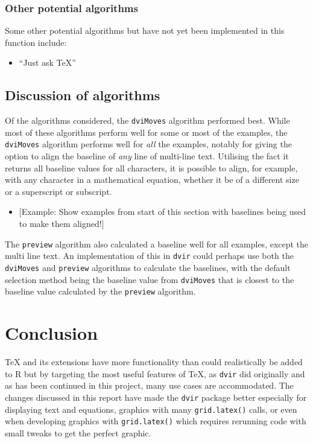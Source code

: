 \documentclass[]{article}
\providecommand{\tightlist}{%
  \setlength{\itemsep}{0pt}\setlength{\parskip}{0pt}}
\begin{document}
\subsubsection{Other potential
algorithms}\label{other-potential-algorithms}

Some other potential algorithms but have not yet been implemented in
this function include:

\begin{itemize}
\tightlist
\item
  ``Just ask \TeX{}''
\end{itemize}

\subsection{Discussion of algorithms}\label{discussion-of-algorithms}

Of the algorithms considered, the \texttt{dviMoves} algorithm performed
best. While most of these algorithms perform well for some or most of
the examples, the \texttt{dviMoves} algorithm performs well for
\emph{all} the examples, notably for giving the option to align the
baseline of \emph{any} line of multi-line text. Utilising the fact it
returns all baseline values for all characters, it is possible to align,
for example, with any character in a mathematical equation, whether it
be of a different size or a superscript or subscript.

\begin{itemize}
\tightlist
\item
  {[}Example: Show examples from start of this section with baselines
  being used to make them aligned!{]}
\end{itemize}

The \texttt{preview} algorithm also calculated a baseline well for all
examples, except the multi line text. An implementation of this in
\texttt{dvir} could perhaps use both the \texttt{dviMoves} and
\texttt{preview} algorithms to calculate the baselines, with the default
selection method being the baseline value from \texttt{dviMoves} that is
closest to the baseline value calculated by the \texttt{preview}
algorithm.

\newpage{}

\section{Conclusion}\label{conclusion}

\TeX{} and its extensions have more functionality than could
realistically be added to R but by targeting the most useful features of
\TeX{}, as \texttt{dvir} did originally and as has been continued in
this project, many use cases are accommodated. The changes discussed in
this report have made the \texttt{dvir} package better especially for
displaying text and equations, graphics with many \texttt{grid.latex()}
calls, or even when developing graphics with \texttt{grid.latex()} which
requires rerunning code with small tweaks to get the perfect graphic.
\end{document}
